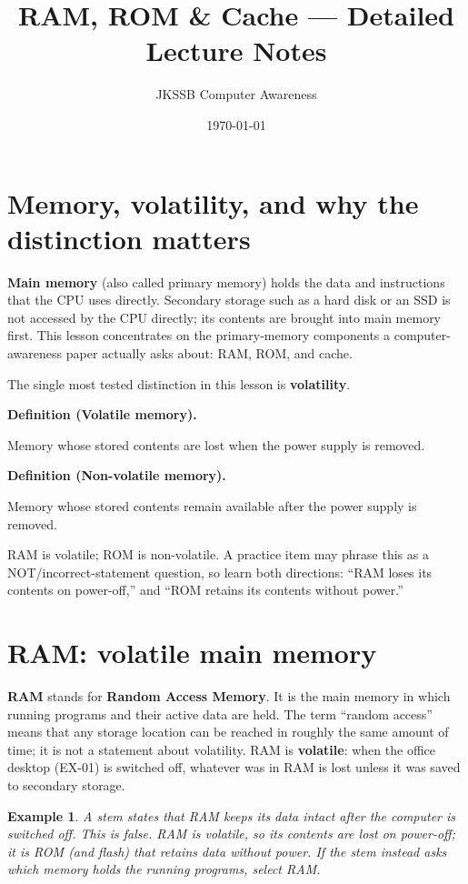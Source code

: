 \documentclass[11pt]{article}
\title{RAM, ROM \& Cache --- Detailed Lecture Notes}
\author{JKSSB Computer Awareness}
\date{\today}
\newtheorem{example}{Example}[section]
\newenvironment{definitionbox}[1]{%
  \par\noindent\textbf{Definition (#1).}\ \itshape
}{\par\vspace{0.3em}}
\begin{document}
\maketitle

\section{Memory, volatility, and why the distinction matters}
\textbf{Main memory} (also called primary memory) holds the data and
instructions that the CPU uses directly. Secondary storage such as a hard
disk or an SSD is not accessed by the CPU directly; its contents are brought
into main memory first. This lesson concentrates on the primary-memory
components a computer-awareness paper actually asks about: RAM, ROM, and
cache.

The single most tested distinction in this lesson is \textbf{volatility}.

\begin{definitionbox}{Volatile memory}
Memory whose stored contents are lost when the power supply is removed.
\end{definitionbox}

\begin{definitionbox}{Non-volatile memory}
Memory whose stored contents remain available after the power supply is
removed.
\end{definitionbox}

RAM is volatile; ROM is non-volatile. A practice item may phrase this as a
NOT/incorrect-statement question, so learn both directions: ``RAM loses its
contents on power-off,'' and ``ROM retains its contents without power.''

\section{RAM: volatile main memory}
\textbf{RAM} stands for \textbf{Random Access Memory}. It is the main memory
in which running programs and their active data are held. The term ``random
access'' means that any storage location can be reached in roughly the same
amount of time; it is not a statement about volatility. RAM is
\textbf{volatile}: when the office desktop (EX-01) is switched off, whatever
was in RAM is lost unless it was saved to secondary storage.

\begin{example}
A stem states that RAM keeps its data intact after the computer is switched
off. This is false. RAM is volatile, so its contents are lost on power-off;
it is ROM (and flash) that retains data without power. If the stem instead
asks which memory holds the running programs, select RAM.
\end{example}
\end{document}
